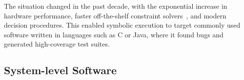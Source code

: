 The situation changed in the past decade, with the exponential increase in hardware performance, faster off-the-shelf constraint solvers~\cite{chaff,minisat,stp,Z3,cvc}, and modern decision procedures.
%
This enabled symbolic execution to target commonly used software written in languages such as C or Java, where it found bugs and generated high-coverage test suites.

\subsection{System-level Software}










